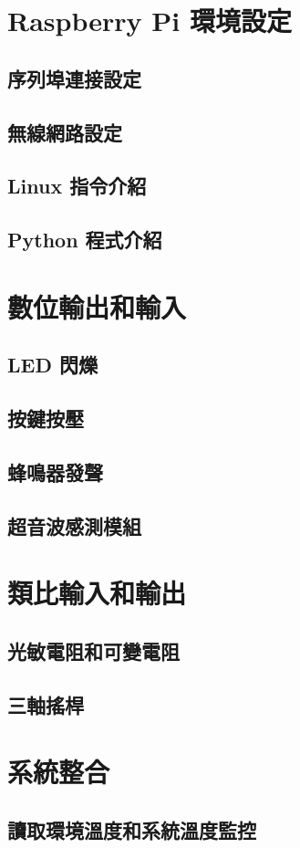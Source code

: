 \documentclass[12pt]{article}
\begin{document}
\section{Raspberry Pi 環境設定}
\subsection{序列埠連接設定}

\subsection{無線網路設定}

\subsection{Linux 指令介紹}

\subsection{Python 程式介紹}

\section{數位輸出和輸入}

\subsection{LED 閃爍}

\subsection{按鍵按壓}

\subsection{蜂鳴器發聲}

\subsection{超音波感測模組}


\section{類比輸入和輸出}

\subsection{光敏電阻和可變電阻}

\subsection{三軸搖桿}



\section{系統整合}

\subsection{讀取環境溫度和系統溫度監控}
\end{document}

